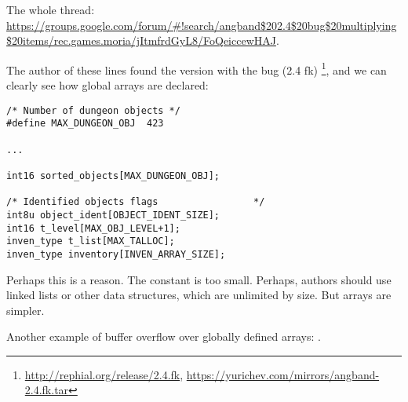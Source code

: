The whole thread: \url{https://groups.google.com/forum/#!search/angband$202.4$20bug$20multiplying$20items/rec.games.moria/jItmfrdGyL8/FoQeiccewHAJ}.

The author of these lines found the version with the bug (2.4 fk)
\footnote{\url{http://rephial.org/release/2.4.fk}, \url{https://yurichev.com/mirrors/angband-2.4.fk.tar}},
and we can clearly see how global arrays are declared:

\begin{lstlisting}
/* Number of dungeon objects */
#define MAX_DUNGEON_OBJ  423

...

int16 sorted_objects[MAX_DUNGEON_OBJ];

/* Identified objects flags					*/
int8u object_ident[OBJECT_IDENT_SIZE];
int16 t_level[MAX_OBJ_LEVEL+1];
inven_type t_list[MAX_TALLOC];
inven_type inventory[INVEN_ARRAY_SIZE];
\end{lstlisting}

Perhaps this is a reason. The  constant is too small.
Perhaps, authors should use linked lists or other data structures, which are unlimited by size.
But arrays are simpler.

Another example of buffer overflow over globally defined arrays: .

